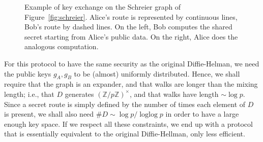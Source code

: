 \documentclass[10pt]{article}
\theoremstyle{plain}
\theoremstyle{definition}
\DeclareMathOperator{\loglog}{loglog}
\begin{document}
\begin{figure}
  \centering
  \newcommand{\myedge}[3]{
    \draw[#3] (360/\crater*#1 : \diam) to[bend right] (360/\crater*#2 : \diam);
  }

  \caption{Example of key exchange on the Schreier graph of
    Figure~\ref{fig:schreier}.  Alice's route is represented by
    continuous lines, Bob's route by dashed lines. On the left, Bob
    computes the shared secret starting from Alice's public data. On
    the right, Alice does the analogous computation.}
  \label{fig:dh-walk-pict}
\end{figure}

For this protocol to have the same security as the original
Diffie-Helman, we need the public keys $g_A,g_B$ to be (almost)
uniformly distributed. %
Hence, we shall require that the graph is an expander, and that walks
are longer than the mixing length; i.e., that $D$ generates
$(ℤ/pℤ)^{×}$, and that walks have length $\sim\log p$. %
Since a secret route is simply defined by the number of times each
element of $D$ is present, we shall also need
$\#D\sim \log p/\loglog p$ in order to have a large enough key
space. %
If we respect all these constraints, we end up with a protocol that is
essentially equivalent to the original Diffie-Hellman, only less
efficient.
\end{document}
